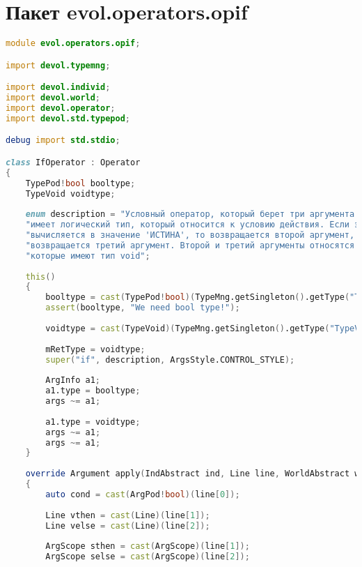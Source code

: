 \documentclass[russian,utf8,emptystyle]{eskdtext}
\begin{document}
\section{Пакет evol.operators.opif}
\begin{lstlisting}[language=D]
module evol.operators.opif;

import devol.typemng;

import devol.individ;
import devol.world;
import devol.operator;  
import devol.std.typepod;

debug import std.stdio;

class IfOperator : Operator
{
    TypePod!bool booltype;
    TypeVoid voidtype;
    
    enum description = "Условный оператор, который берет три аргумента. Первый "
    "имеет логический тип, который относится к условию действия. Если этот аргумент "
    "вычисляется в значение 'ИСТИНА', то возвращается второй аргумент, иначе "
    "возвращается третий аргумент. Второй и третий аргументы относятся к действиям, "
    "которые имеют тип void";
    
    this()
    {
        booltype = cast(TypePod!bool)(TypeMng.getSingleton().getType("Typebool"));
        assert(booltype, "We need bool type!");
        
        voidtype = cast(TypeVoid)(TypeMng.getSingleton().getType("TypeVoid"));
        
        mRetType = voidtype;
        super("if", description, ArgsStyle.CONTROL_STYLE);
        
        ArgInfo a1;
        a1.type = booltype;
        args ~= a1;
        
        a1.type = voidtype;
        args ~= a1;
        args ~= a1;
    }
    
    override Argument apply(IndAbstract ind, Line line, WorldAbstract world)
    {
        auto cond = cast(ArgPod!bool)(line[0]);
        
        Line vthen = cast(Line)(line[1]);
        Line velse = cast(Line)(line[2]);
        
        ArgScope sthen = cast(ArgScope)(line[1]);
        ArgScope selse = cast(ArgScope)(line[2]);
        

\end{lstlisting}
\end{document}

